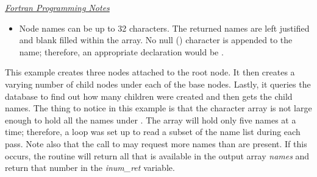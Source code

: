 \noindent
\uline{\textit{Fortran Programming Notes}}
\begin{itemize}
\item Node names can be up to 32 characters.
      The returned names are left justified and blank filled within the
      array.
      No null () character is appended to the
      name; therefore, an appropriate declaration would be
      .
\end{itemize}

\hypertarget{ex:Children\_Names}{}
\Example

This example creates three nodes attached to the root node.
It then creates a varying number of child nodes under each of the base
nodes.
Lastly, it queries the database to find out how many children were
created and then gets the child names.
The thing to notice in this example is that the character array
 is not large enough to hold all the names under
.
The array  will hold only five names at a time; therefore,
a loop was set up to read a subset of the name list during each pass.
Note also that the call to  may request more names than
are present.
If this occurs, the routine will return all that is available in the
output array \textit{names} and return that number in the
\textit{inum\_ret} variable.

